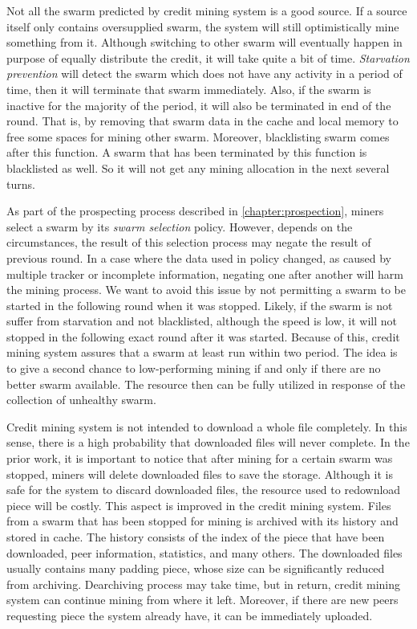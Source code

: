 Not all the swarm predicted by credit mining system is a good source. If a source itself only contains oversupplied swarm, the system will still optimistically mine something from it. Although switching to other swarm will eventually happen in purpose of equally distribute the credit, it will take quite a bit of time. \textit{Starvation prevention} will detect the swarm which does not have any activity in a period of time, then it will terminate that swarm immediately. Also, if the swarm is inactive for the majority of the period, it will also be terminated in end of the round. That is, by removing that swarm data in the cache and local memory to free some spaces for mining other swarm. Moreover, blacklisting swarm comes after this function. A swarm that has been terminated by this function is blacklisted as well. So it will not get any mining allocation in the next several turns.

As part of the prospecting process described in \ref{chapter:prospection}, miners select a swarm by its \textit{swarm selection} policy. However, depends on the circumstances, the result of this selection process may negate the result of previous round. In a case where the data used in policy changed, as caused by multiple tracker or incomplete information, negating one after another will harm the mining process. We want to avoid this issue by not permitting a swarm to be started in the following round when it was stopped. Likely, if the swarm is not suffer from starvation and not blacklisted, although the speed is low, it will not stopped in the following exact round after it was started. Because of this, credit mining system assures that a swarm at least run within two period. The idea is to give a second chance to low-performing mining if and only if there are no better swarm available.  The resource then can be fully utilized in response of the collection of unhealthy swarm. 

Credit mining system is not intended to download a whole file completely. In this sense, there is a high probability that downloaded files will never complete. In the prior work, it is important to notice that after mining for a certain swarm was stopped, miners will delete downloaded files to save the storage. Although it is safe for the system to discard downloaded files, the resource used to redownload piece will be costly. This aspect is improved in the credit mining system. Files from a swarm that has been stopped for mining is archived with its history and stored in cache. The history consists of the index of the piece that have been downloaded, peer information, statistics, and many others. The downloaded files usually contains many padding piece, whose size can be significantly reduced from archiving. Dearchiving process may take time, but in return, credit mining system can continue mining from where it left. Moreover, if there are new peers requesting piece the system already have, it can be immediately uploaded.